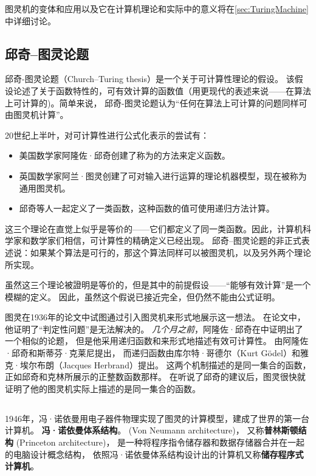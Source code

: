 图灵机的变体和应用以及它在计算机理论和实际中的意义将在\cref{sec:TuringMachine}中详细讨论。

\subsection{邱奇--图灵论题}
邱奇-图灵论题（Church--Turing thesis）是一个关于可计算性理论的假设。
该假设论述了关于函数特性的，可有效计算的函数值（用更现代的表述来说——在算法上可计算的)。简单来说，
邱奇-图灵论题认为``任何在算法上可计算的问题同样可由图灵机计算''。

20世纪上半叶，对可计算性进行公式化表示的尝试有：
\begin{itemize}
        \item 美国数学家阿隆佐·邱奇创建了称为\LambdaCalculus 的方法来定义函数。
        \item 英国数学家阿兰·图灵创建了可对输入进行运算的理论机器模型，现在被称为通用图灵机。
        \item 邱奇等人一起定义了一类函数，这种函数的值可使用递归方法计算。
\end{itemize}

这三个理论在直觉上似乎是等价的——它们都定义了同一类函数。因此，计算机科学家和数学家们相信，可计算性的精确定义已经出现。
邱奇--图灵论题的非正式表述说：如果某个算法是可行的，那这个算法同样可以被图灵机，以及另外两个理论所实现。

虽然这三个理论被證明是等价的，但是其中的前提假设——``能够有效计算''是一个模糊的定义。
因此，虽然这个假说已接近完全，但仍然不能由公式证明。

图灵在1936年的论文\cite{doi:10.1112/plms/s2-42.1.230}中试图通过引入图灵机来形式地展示这一想法。
在论文中，他证明了``判定性问题''是无法解决的。
\emph{几个月之前}，阿隆佐·邱奇在\cite{DBLP:journals/jsyml/Church36}中证明出了一个相似的论题，
但是他采用递归函数和\LambdaCalculus 来形式地描述有效可计算性。
\LambdaCalculus 由阿隆佐·邱奇和斯蒂芬·克莱尼提出\cite{10.2307/2372027,bernays_1936}，
而递归函数由库尔特·哥德尔（Kurt G\"odel）和雅克·埃尔布朗（Jacques Herbrand）提出。
这两个机制描述的是同一集合的函数，正如邱奇和克林所展示的正整数函数那样。
在听说了邱奇的建议后，图灵很快就证明了他的图灵机实际上描述的是同一集合的函数。

\subsection{\VonArch}
\def\VonNeumann{冯·诺依曼}
\def\VonArch{\VonNeumann 体系结构}

1946年，\VonNeumann 用电子器件物理实现了图灵的计算模型，建成了世界的第一台计算机。
\textbf{\VonArch}\cite{DBLP:journals/annals/Neumann93}。 (Von Neumann architecture)，
又称\textbf{普林斯顿结构} (Princeton architecture)，
是一种将程序指令储存器和数据存储器合并在一起的电脑设计概念结构，
依照\VonArch 设计出的计算机又称\textbf{储存程序式计算机}。

